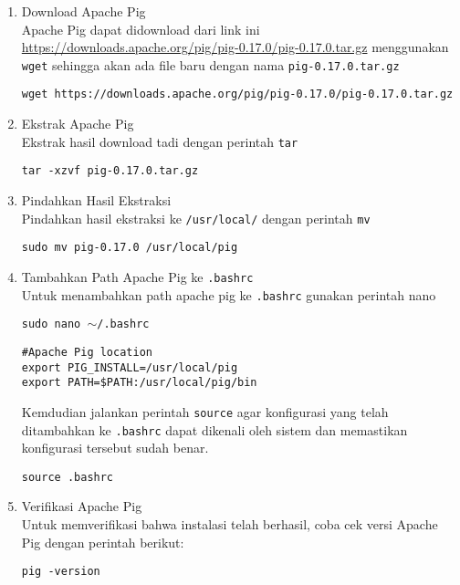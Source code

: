 \documentclass[a4paper]{tufte-handout}
\begin{document}
\begin{enumerate}
\item Download Apache Pig  \\
Apache Pig dapat didownload dari link ini \url{https://downloads.apache.org/pig/pig-0.17.0/pig-0.17.0.tar.gz} menggunakan {\tt wget} sehingga akan ada file baru dengan nama {\tt pig-0.17.0.tar.gz}

{\tt wget https://downloads.apache.org/pig/pig-0.17.0/pig-0.17.0.tar.gz}

\item Ekstrak Apache Pig \\
Ekstrak hasil download tadi dengan perintah {\tt tar}

{\tt tar -xzvf pig-0.17.0.tar.gz}

\item Pindahkan Hasil Ekstraksi \\
Pindahkan hasil ekstraksi ke {\tt /usr/local/} dengan perintah {\tt mv}

{\tt sudo mv pig-0.17.0 /usr/local/pig}

\item Tambahkan Path Apache Pig ke {\tt .bashrc} \\
Untuk menambahkan path apache pig ke {\tt .bashrc} gunakan perintah nano

{\tt sudo nano $\sim$/.bashrc}

\begin{lstlisting}
#Apache Pig location
export PIG_INSTALL=/usr/local/pig
export PATH=$PATH:/usr/local/pig/bin
\end{lstlisting}

Kemdudian jalankan perintah {\tt source} agar konfigurasi yang telah ditambahkan ke {\tt .bashrc} dapat dikenali oleh sistem dan memastikan konfigurasi tersebut sudah benar.

{\tt source .bashrc}

\item Verifikasi Apache Pig \\
Untuk memverifikasi bahwa instalasi telah berhasil, coba cek versi Apache Pig dengan perintah berikut:

{\tt pig -version}
\end{enumerate}

\clearpage
{}

\end{document}
